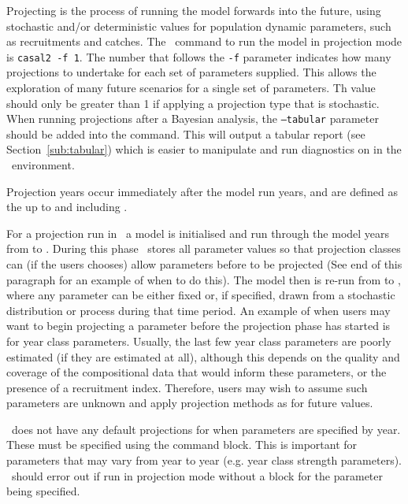 \subsubsection{}\label{sec:projection}

Projecting is the process of running the model forwards into the future, using stochastic and/or deterministic values for population dynamic parameters, such as recruitments and catches. The \CNAME\ command to run the model in projection mode is \texttt{casal2 -f 1}. The number that follows the \texttt{-f} parameter indicates how many projections to undertake for each set of parameters supplied. This allows the exploration of many future scenarios for a single set of parameters. Th value should only be greater than 1 if applying a projection type that is stochastic. When running projections after a Bayesian analysis, the \texttt{--tabular} parameter should be added into the command. This will output a tabular report (see Section~\ref{sub:tabular}) which is easier to manipulate and run diagnostics on in the \R\ environment.

Projection years occur immediately after the model run years, and are defined as the  up to and including .

For a projection run in \CNAME\, a model is initialised and run through the model years from  to . During this phase \CNAME\ stores all parameter values so that projection classes can (if the users chooses) allow parameters before  to be projected (See end of this paragraph for an example of when to do this). The model then is re-run from  to , where any parameter can be either fixed or, if specified, drawn from a stochastic distribution or process during that time period. An example of when users may want to begin projecting a parameter before the projection phase has started is for year class parameters. Usually, the last few year class parameters are poorly estimated (if they are estimated at all), although this depends on the quality and coverage of the compositional data that would inform these parameters, or the presence of a recruitment index. Therefore, users may wish to assume such parameters are unknown and apply projection methods as for future values.

\CNAME\ does not have any default projections for when parameters are specified by year. These must be specified using the  command block. This is important for parameters that may vary from year to year (e.g. year class strength parameters). \CNAME\ should error out if run in projection mode without a  block for the  parameter being specified.


